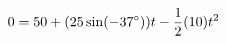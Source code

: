 \documentclass[preview]{standalone}
\begin{document}
\begin{align*}
\special{dvisvgm:raw <g id='unique000'>}0 = 50 + (25 \sin(-37^{\circ}))t - \frac{1}{2}(10)t^2\special{dvisvgm:raw </g>}
\end{align*}
\end{document}
